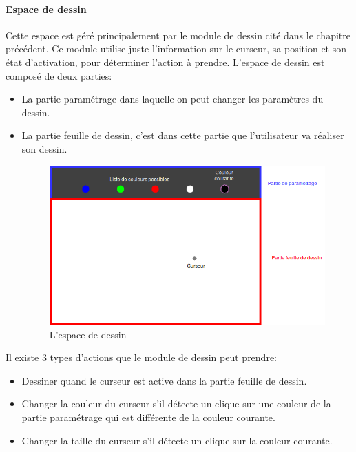 \documentclass[12pt]{report}
\begin{document}
\paragraph{Espace de dessin}
Cette espace est géré principalement par le module de dessin cité dans le chapitre précédent. Ce module utilise juste l’information sur le curseur, sa position et son état d’activation, pour déterminer l’action à prendre. L’espace de dessin est composé de deux parties:
\begin{itemize}
	\item La partie paramétrage dans laquelle on peut changer les paramètres du dessin.
	\item La partie feuille de dessin, c’est dans cette partie que l’utilisateur va réaliser son dessin.
	\begin{figure}[H]
		\centering
		\includegraphics[scale=0.75]{imgs/Drawer.png}
		\caption{L'espace de dessin}
		\label{fig:Drawer}
	\end{figure}
\end{itemize}

Il existe 3 types d’actions que le module de dessin peut prendre:
\begin{itemize}
	\item Dessiner quand le curseur est active dans la partie feuille de dessin.
	\item Changer la couleur du curseur s’il détecte un clique sur une couleur de la partie paramétrage qui est différente de la couleur courante.
	\item Changer la taille du curseur s’il détecte un clique sur la couleur courante.  
\end{itemize}
\end{document}
